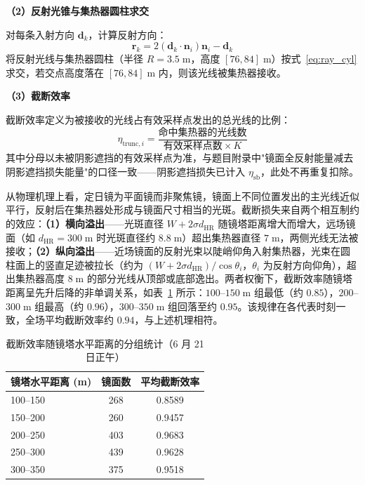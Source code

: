 \documentclass[12pt,a4paper,fontset=fandol]{ctexart}
\begin{document}
\textbf{（2）反射光锥与集热器圆柱求交}

对每条入射方向 $\mathbf{d}_k$，计算反射方向：
\begin{equation}
    \mathbf{r}_k = 2(\mathbf{d}_k \cdot \mathbf{n}_i)\mathbf{n}_i - \mathbf{d}_k
    \label{eq:cone_reflect}
\end{equation}
将反射光线与集热器圆柱（半径 $R = 3.5\;\mathrm{m}$，高度 $[76, 84]\;\mathrm{m}$）按式~\eqref{eq:ray_cyl} 求交，若交点高度落在 $[76, 84]\;\mathrm{m}$ 内，则该光线被集热器接收。

\textbf{（3）截断效率}

截断效率定义为被接收的光线占有效采样点发出的总光线的比例：
\begin{equation}
    \eta_{\mathrm{trunc},i} = \frac{\text{命中集热器的光线数}}{\text{有效采样点数} \times K}
    \label{eq:eta_trunc}
\end{equation}
其中分母以未被阴影遮挡的有效采样点为准，与题目附录中"镜面全反射能量减去阴影遮挡损失能量"的口径一致——阴影遮挡损失已计入 $\eta_{\mathrm{sb}}$，此处不再重复扣除。

从物理机理上看，定日镜为平面镜而非聚焦镜，镜面上不同位置发出的主光线近似平行，反射后在集热器处形成与镜面尺寸相当的光斑。截断损失来自两个相互制约的效应：\textbf{（1）横向溢出}——光斑直径 $W + 2\sigma d_{\mathrm{HR}}$ 随镜塔距离增大而增大，远场镜面（如 $d_{\mathrm{HR}} = 300\;\mathrm{m}$ 时光斑直径约 $8.8\;\mathrm{m}$）超出集热器直径 $7\;\mathrm{m}$，两侧光线无法被接收；\textbf{（2）纵向溢出}——近场镜面的反射光束以陡峭仰角入射集热器，光束在圆柱面上的竖直足迹被拉长（约为 $(W + 2\sigma d_{\mathrm{HR}})/\cos\theta_i$，$\theta_i$ 为反射方向仰角），超出集热器高度 $8\;\mathrm{m}$ 的部分光线从顶部或底部逸出。两者权衡下，截断效率随镜塔距离呈先升后降的非单调关系，如表~\ref{tab:trunc_distance} 所示：$100$--$150\;\mathrm{m}$ 组最低（约 $0.85$），$200$--$300\;\mathrm{m}$ 组最高（约 $0.96$），$300$--$350\;\mathrm{m}$ 组回落至约 $0.95$。该规律在各代表时刻一致，全场平均截断效率约 $0.94$，与上述机理相符。

\begin{table}[H]
    \centering
    \small
    \caption{截断效率随镜塔水平距离的分组统计（6 月 21 日正午）}
    \label{tab:trunc_distance}
    \begin{tabular}{lcc}
        \toprule
        镜塔水平距离 (m) & 镜面数 & 平均截断效率 \\
        \midrule
        100--150 & 268 & 0.8589 \\
        150--200 & 260 & 0.9457 \\
        200--250 & 403 & 0.9683 \\
        250--300 & 439 & 0.9628 \\
        300--350 & 375 & 0.9518 \\
        \bottomrule
    \end{tabular}
\end{table}
\end{document}
